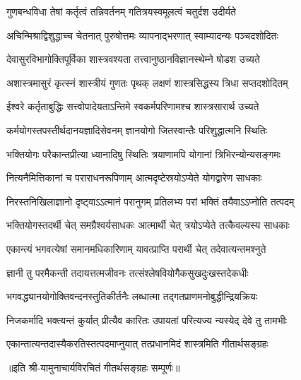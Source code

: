 \twolineshloka
{गुणबन्धविधा तेषां कर्तृत्वं तन्निवर्तनम्}
{गतित्रयस्वमूलत्वं चतुर्दश उदीर्यते}

\twolineshloka
{अचिन्मिश्राद्विशुद्धाच्च चेतनात् पुरुषोत्तमः}
{व्यापनाद्भरणात् स्वाम्यादन्यः पञ्चदशोदितः}

\twolineshloka
{देवासुरविभागोक्तिपूर्विका शास्त्रवश्यता}
{तत्त्वानुष्ठानविज्ञानस्थेम्ने षोडश उच्यते}

\twolineshloka
{अशास्त्रमासुरं कृत्स्नं शास्त्रीयं गुणतः पृथक्}
{लक्षणं शास्त्रसिद्धस्य त्रिधा सप्तदशोदितम्}

\twolineshloka
{ईश्वरे कर्तृताबुद्धिः सत्त्वोपादेयताऽन्तिमे}
{स्वकर्मपरिणामश्च शास्त्रसारार्थ उच्यते}

\twolineshloka
{कर्मयोगस्तपस्तीर्थदानयज्ञादिसेवनम्}
{ज्ञानयोगो जितस्वान्तैः परिशुद्धात्मनि स्थितिः}

\twolineshloka
{भक्तियोगः परैकान्तप्रीत्या ध्यानादिषु स्थितिः}
{त्रयाणामपि योगानां त्रिभिरन्योन्यसङ्गमः}

\twolineshloka
{नित्यनैमित्तिकानां च पराराधनरूपिणाम्}
{आत्मदृष्टेस्रयोऽप्येते योगद्वारेण साधकाः}

\twolineshloka
{निरस्तनिखिलाज्ञानो दृष्ट्वाऽऽत्मानं परानुगम्}
{प्रतिलभ्य परां भक्तिं तयैवाऽऽप्नोति तत्पदम्}

\twolineshloka
{भक्तियोगस्तदर्थी चेत् समग्रैश्वर्यसाधकः}
{आत्मार्थी चेत् त्रयोऽप्येते तत्कैवल्यस्य साधकाः}

\twolineshloka
{एकान्त्यं भगवत्येषां समानमधिकारिणाम्}
{यावत्प्राप्ति परार्थी चेत् तदेवात्यन्तमश्नुते}

\twolineshloka
{ज्ञानी तु परमैकन्ती तदायत्तत्मजीवनः}
{तत्संश्लेषवियोगैकसुखदुःखस्तदेकधीः}

\twolineshloka
{भगवद्\mbox{}ध्यानयोगोक्तिवन्दनस्तुतिकीर्तनैः}
{लब्धात्मा तद्गतप्राणमनोबुद्धीन्द्रियक्रियः}

\twolineshloka
{निजकर्मादि भक्त्यन्तं कुर्यात् प्रीत्यैव कारितः}
{उपायतां परित्यज्य न्यस्येद् देवे तु तामभीः}

\twolineshloka
{एकान्तात्यन्तदास्यैकरतिस्तत्पदमाप्नुयात्}
{तत्प्रधानमिदं शास्त्रमिति गीतार्थसङ्ग्रहः}

॥इति श्री-यामुनाचार्यविरचितं गीतर्थसङ्ग्रहः सम्पूर्णः॥